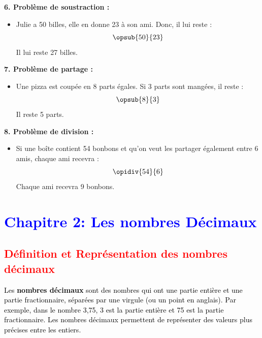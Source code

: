 \documentclass{article}
\begin{document}
\begin{tcolorbox}[colback=green!10!white, colframe=green!75!black, sharp corners=south, boxrule=0.8mm, title=Corrections]

    \textbf{6. Problème de soustraction :}
    \begin{itemize}
        \item Julie a 50 billes, elle en donne 23 à son ami. Donc, il lui reste :
        \[
        \opsub{50}{23} 
        \]
        Il lui reste 27 billes.
    \end{itemize}

    \textbf{7. Problème de partage :}
    \begin{itemize}
        \item Une pizza est coupée en 8 parts égales. Si 3 parts sont mangées, il reste :
        \[
        \opsub{8}{3} 
        \]
        Il reste 5 parts.
    \end{itemize}

    \textbf{8. Problème de division :}
    \begin{itemize}
        \item Si une boîte contient 54 bonbons et qu’on veut les partager également entre 6 amis, chaque ami recevra :
        \[
        \opidiv{54}{6} 
        \]
        Chaque ami recevra 9 bonbons.
    \end{itemize}
\end{tcolorbox}

\newpage

\section{\textcolor{blue}{Chapitre 2: Les nombres Décimaux}}

\subsection{\textcolor{red}{Définition et Représentation des nombres décimaux}}

\vspace{0.2cm}

\begin{tcolorbox}[colback=cyan!10!white, colframe=red!75!black, title=\textcolor{white}{Définition}, 
                  sharp corners=southwest]

\textcolor{black}{Les \textbf{nombres décimaux} sont des nombres qui ont une partie entière et une partie fractionnaire, séparées par une virgule (ou un point en anglais). Par exemple, dans le nombre 3,75, 3 est la partie entière et 75 est la partie fractionnaire. Les nombres décimaux permettent de représenter des valeurs plus précises entre les entiers.}

\end{tcolorbox}
\end{document}
